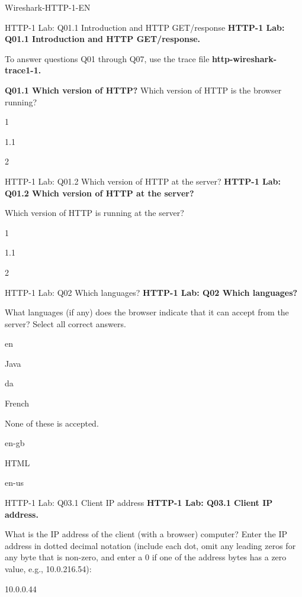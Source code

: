 \documentclass[a4paper]{article}
\begin{document}
\begin{quiz}{Wireshark-HTTP-1-EN}

\begin{multi}[points=1,shuffle]{HTTP-1 Lab: Q01.1 Introduction and HTTP GET/response}
\textbf{HTTP-1 Lab: Q01.1 Introduction and HTTP GET/response.}

To answer questions Q01 through Q07, use the trace file \textbf{http-wireshark-trace1-1.} 

\textbf{Q01.1 Which version of HTTP?} 
Which version of HTTP is the browser running?
\item 1
\item* 1.1
\item 2
\end{multi}

\begin{multi}[points=1,shuffle]{HTTP-1 Lab: Q01.2 Which version of HTTP at the server?}
\textbf{HTTP-1 Lab: Q01.2 Which version of HTTP at the server?} 

Which version of HTTP is running at the server? 
\item 1
\item* 1.1
\item 2
\end{multi}

\begin{multi}[points=1,shuffle,multiple]{HTTP-1 Lab: Q02 Which languages?}
\textbf{HTTP-1 Lab: Q02 Which languages?} 

What languages (if any) does the browser indicate that it can accept from the server? Select all correct answers.
\item* en
\item Java
\item da
\item French
\item None of these is accepted.
\item en-gb
\item HTML
\item* en-us
\end{multi}

\begin{shortanswer}[points=1]{HTTP-1 Lab: Q03.1 Client IP address}
\textbf{HTTP-1 Lab: Q03.1 Client IP address.} 

What is the IP address of the client (with a browser) computer? Enter the IP address in dotted decimal notation (include each dot, omit any leading zeros for any byte that is non-zero, and enter a 0 if one of the address bytes has a zero value, e.g., 10.0.216.54):
\item 10.0.0.44
\end{shortanswer}


\end{quiz}
\end{document}
